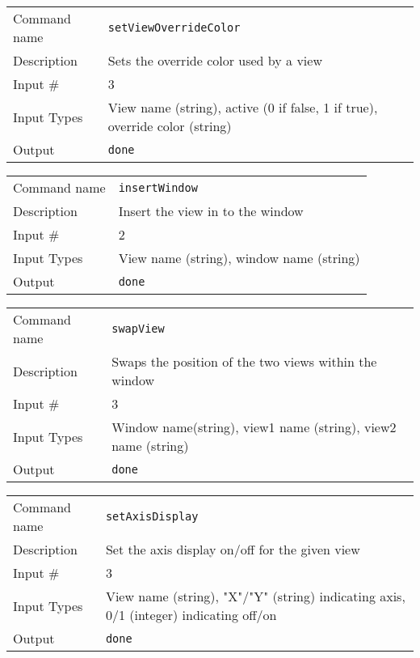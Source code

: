 \bigskip

\noindent
\begin{tabular}{l|p{5in}}
\hline
Command name & {\tt setViewOverrideColor} \\
Description  & Sets the override color used by a view \\
Input \#     & 3 \\
Input Types  & View name (string), active (0 if false, 1 if true),
               override color (string) \\
Output       & {\tt done} \\
\hline
\end{tabular}

\bigskip

\noindent
\begin{tabular}{l|p{5in}}
\hline
Command name & {\tt insertWindow} \\
Description  & Insert the view in to the window \\
Input \#     & 2 \\
Input Types  & View name (string), window name (string) \\
Output       & {\tt done} \\
\hline
\end{tabular}

\bigskip

\noindent
\begin{tabular}{l|p{5in}}
\hline
Command name & {\tt swapView} \\
Description  & Swaps the position of the two views within the window \\
Input \#     & 3 \\
Input Types  & Window name(string), view1 name (string), view2 name (string) \\
Output       & {\tt done} \\
\hline
\end{tabular}

\bigskip

\noindent
\begin{tabular}{l|p{5in}}
\hline
Command name & {\tt setAxisDisplay} \\
Description  & Set the axis display on/off for the given view \\
Input \#     & 3 \\
Input Types  & View name (string), "X"/"Y" (string) indicating axis,
               0/1 (integer) indicating off/on \\
Output       & {\tt done} \\
\hline
\end{tabular}

